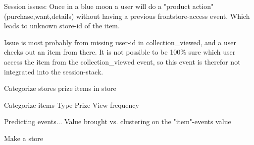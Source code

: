 Session issues:
Once in a blue moon a user will do a "product action" (purchase,want,details)
without having a previous frontstore-access event. Which leads to unknown
store-id of the item.

Issue is most probably from missing user-id in collection\_viewed, and a user
checks out an item from there. It is not possible to be 100\% sure which user
access the item from the collection\_viewed event, so this event is therefor
not integrated into the session-stack.


Categorize stores
    prize
    items in store

Categorize items
    Type
    Prize
    View frequency

Predicting events...
    Value brought vs. clustering on the "item"-events value

Make a store










